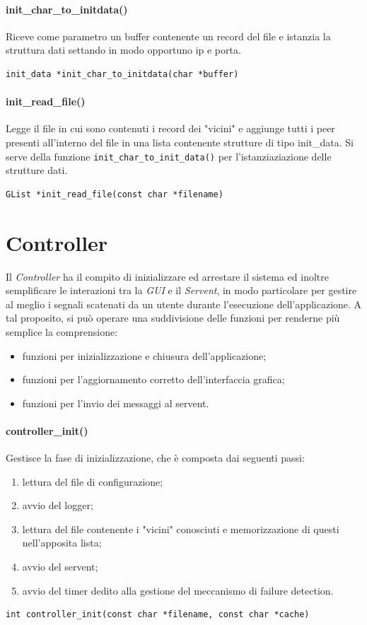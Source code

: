 \paragraph{init\_char\_to\_initdata()}
Riceve come parametro un buffer contenente un record del file e istanzia la struttura dati settando in modo opportuno ip e porta.
\begin{lstlisting}
init_data *init_char_to_initdata(char *buffer)
\end{lstlisting}
\paragraph{init\_read\_file()}
Legge il file in cui sono contenuti i record dei "vicini" e aggiunge tutti i peer presenti all'interno del file in una lista contenente strutture di tipo init\_data. Si serve della funzione \texttt{init\_char\_to\_init\_data()} per l'istanziaziazione delle strutture dati.
\begin{lstlisting}
GList *init_read_file(const char *filename)
\end{lstlisting}

\section{Controller}
Il \textit{Controller} ha il compito di inizializzare ed arrestare il sistema ed inoltre semplificare le interazioni tra la \textit{GUI} e il \textit{Servent}, in modo particolare per gestire al meglio i segnali scatenati da un utente durante l'esecuzione dell'applicazione. A tal proposito, si può operare una suddivisione delle funzioni per renderne più semplice la comprensione:
\begin{itemize}
\item funzioni per inizializzazione e chiusura dell'applicazione;
\item funzioni per l'aggiornamento corretto dell'interfaccia grafica;
\item funzioni per l'invio dei messaggi al servent.
\end{itemize}
\paragraph{controller\_init()}
Gestisce la fase di inizializzazione, che è composta dai seguenti passi:
\begin{enumerate}
\item lettura del file di configurazione;
\item avvio del logger;
\item lettura del file contenente i "vicini" conosciuti e memorizzazione di questi nell'apposita lista;
\item avvio del servent;
\item avvio del timer dedito alla gestione del meccanismo di failure detection.
\end{enumerate}
\begin{lstlisting}
int controller_init(const char *filename, const char *cache)
\end{lstlisting}
